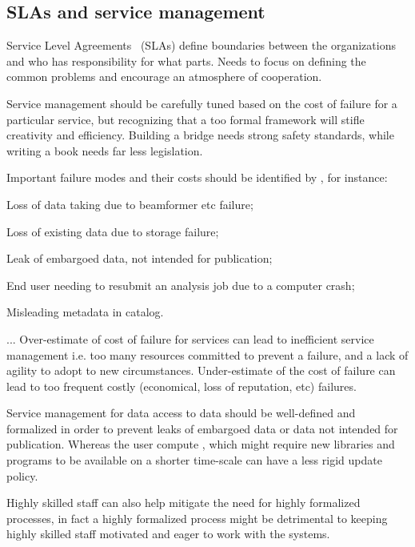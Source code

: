 \documentclass[12pt,a4paper]{article}
\begin{document}



\subsection{SLAs and service management}
\label{ssec:sla}

Service Level Agreements~\cite{sla} (SLAs) define boundaries between the organizations and who has responsibility for what parts. Needs to focus on defining the common problems and encourage an atmosphere of cooperation.

Service management should be carefully tuned based on the cost of failure for a particular service, but recognizing that a too formal framework will stifle creativity and efficiency. 
Building a bridge needs strong safety standards, while writing a book needs far less legislation.

Important failure modes and their costs should be identified by \EC, for instance:
\bitm
\item Loss of data taking due to beamformer etc failure;
\item Loss of existing data due to storage failure;
\item Leak of embargoed data, not intended for publication;
\item End user needing to resubmit an analysis job due to a computer crash;
\item Misleading metadata in catalog.
\item ...
\eitm
Over-estimate of cost of failure for services can lead to inefficient service management i.e. too many resources committed to prevent a failure, and a lack of agility to adopt to new circumstances.
Under-estimate of the cost of failure can lead to too frequent costly (economical, loss of reputation, etc) failures.

Service management for data access to data should be well-defined and formalized in order to prevent leaks of embargoed data or data not intended for publication.
Whereas the user compute \einfra, which might require new libraries and programs to be available on a shorter time-scale can have a less rigid update policy.

Highly skilled staff can also help mitigate the need for highly formalized processes, in fact a highly formalized process might be detrimental to keeping highly skilled staff motivated and eager to work with the systems.
\end{document}
